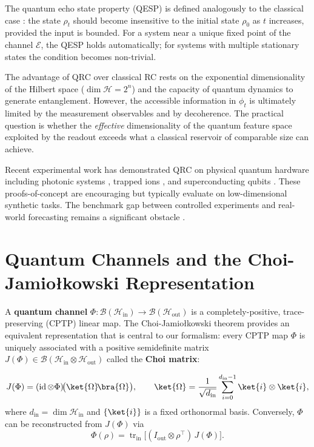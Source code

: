 The quantum echo state property (QESP) is defined analogously to the
classical case \citep{fujii2017keep}: the state $\rho_t$ should become
insensitive to the initial state $\rho_0$ as $t$ increases, provided the
input is bounded. For a system near a unique fixed point of the channel
$\mathcal{E}$, the QESP holds automatically; for systems with multiple
stationary states the condition becomes non-trivial.

The advantage of QRC over classical RC rests on the exponential
dimensionality of the Hilbert space ($\dim \mathcal{H} = 2^n$) and the
capacity of quantum dynamics to generate entanglement. However, the
accessible information in $\phi_t$ is ultimately limited by the
measurement observables and by decoherence. The practical question is
whether the \emph{effective} dimensionality of the quantum feature space
exploited by the readout exceeds what a classical reservoir of comparable
size can achieve.

Recent experimental work has demonstrated QRC on physical quantum
hardware including photonic systems \citep{Dumitrescu2018}, trapped ions
\citep{Chen2020}, and superconducting qubits \citep{Zheng2021}. These
proofs-of-concept are encouraging but typically evaluate on low-dimensional
synthetic tasks. The benchmark gap between controlled experiments and
real-world forecasting remains a significant obstacle
\citep{gosavic2024quantum, gonzalez2024benchmark}.


\section{Quantum Channels and the Choi-Jamiołkowski Representation}
\label{sec:quantum_channels}

A \textbf{quantum channel} $\Phi: \mathcal{B}(\mathcal{H}_{\mathrm{in}})
\to \mathcal{B}(\mathcal{H}_{\mathrm{out}})$ is a completely-positive,
trace-preserving (CPTP) linear map. The Choi-Jamiołkowski theorem
provides an equivalent representation that is central to our
formalism: every CPTP map $\Phi$ is uniquely associated with a
positive semidefinite matrix $J(\Phi) \in \mathcal{B}(\mathcal{H}_{\mathrm{in}}
\otimes \mathcal{H}_{\mathrm{out}})$ called the \textbf{Choi matrix}:

\begin{equation}
J(\Phi) = (\operatorname{id} \otimes \Phi)\!\bigl(
  \ket{\Omega}\!\bra{\Omega} \bigr),
\qquad
\ket{\Omega} = \frac{1}{\sqrt{d_{\mathrm{in}}}}
\sum_{i=0}^{d_{\mathrm{in}}-1} \ket{i} \otimes \ket{i},
\label{eq:choi_def}
\end{equation}
where $d_{\mathrm{in}} = \dim \mathcal{H}_{\mathrm{in}}$ and
$\{\ket{i}\}$ is a fixed orthonormal basis. Conversely, $\Phi$ can be
reconstructed from $J(\Phi)$ via
\begin{equation}
\Phi(\rho) = \operatorname{tr}_{\mathrm{in}}\!\bigl[
  (I_{\mathrm{out}} \otimes \rho^\top) \, J(\Phi) \bigr].
\end{equation}

